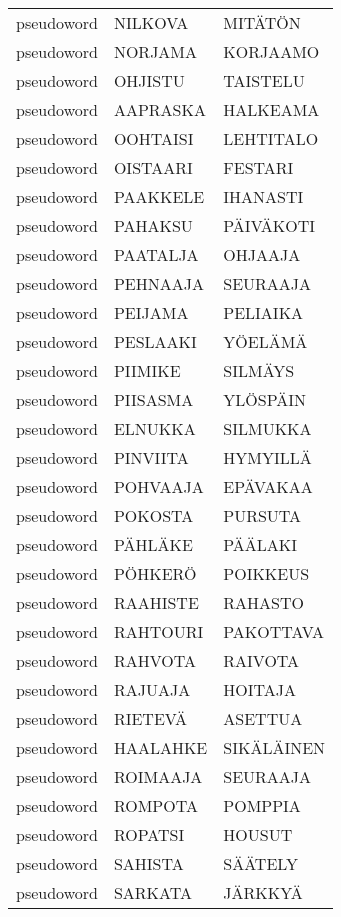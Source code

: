 \begin{tabular}{lll}
 pseudoword &    NILKOVA &        MITÄTÖN \\
 pseudoword &    NORJAMA &       KORJAAMO \\
 pseudoword &    OHJISTU &       TAISTELU \\
 pseudoword &   AAPRASKA &       HALKEAMA \\
 pseudoword &   OOHTAISI &      LEHTITALO \\
 pseudoword &   OISTAARI &        FESTARI \\
 pseudoword &   PAAKKELE &       IHANASTI \\
 pseudoword &    PAHAKSU &      PÄIVÄKOTI \\
 pseudoword &   PAATALJA &        OHJAAJA \\
 pseudoword &   PEHNAAJA &       SEURAAJA \\
 pseudoword &    PEIJAMA &       PELIAIKA \\
 pseudoword &   PESLAAKI &        YÖELÄMÄ \\
 pseudoword &    PIIMIKE &        SILMÄYS \\
 pseudoword &   PIISASMA &       YLÖSPÄIN \\
 pseudoword &    ELNUKKA &       SILMUKKA \\
 pseudoword &   PINVIITA &       HYMYILLÄ \\
 pseudoword &   POHVAAJA &       EPÄVAKAA \\
 pseudoword &    POKOSTA &        PURSUTA \\
 pseudoword &    PÄHLÄKE &        PÄÄLAKI \\
 pseudoword &    PÖHKERÖ &       POIKKEUS \\
 pseudoword &   RAAHISTE &        RAHASTO \\
 pseudoword &   RAHTOURI &      PAKOTTAVA \\
 pseudoword &    RAHVOTA &        RAIVOTA \\
 pseudoword &    RAJUAJA &        HOITAJA \\
 pseudoword &    RIETEVÄ &        ASETTUA \\
 pseudoword &   HAALAHKE &     SIKÄLÄINEN \\
 pseudoword &   ROIMAAJA &       SEURAAJA \\
 pseudoword &    ROMPOTA &        POMPPIA \\
 pseudoword &    ROPATSI &         HOUSUT \\
 pseudoword &    SAHISTA &        SÄÄTELY \\
 pseudoword &    SARKATA &        JÄRKKYÄ \\

\end{tabular}
